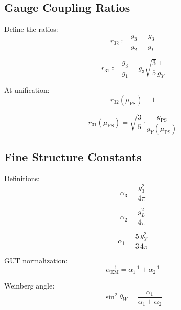 \documentclass[11pt,a4paper]{article}
\theoremstyle{definition}
\begin{document}
\subsection{Gauge Coupling Ratios}
\label{subsec:coupling-ratios}

Define the ratios:
\begin{equation}
  \label{eq:ratio-32}
  r_{32} := \frac{g_3}{g_2} = \frac{g_3}{g_L}
\end{equation}

\begin{equation}
  \label{eq:ratio-31}
  r_{31} := \frac{g_3}{g_1} = g_3 \sqrt{\frac{3}{5}} \frac{1}{g_Y}
\end{equation}

At unification:
\begin{equation}
  \label{eq:ratio-unif-32}
  r_{32}(\mu_{\text{PS}}) = 1
\end{equation}

\begin{equation}
  \label{eq:ratio-unif-31}
  r_{31}(\mu_{\text{PS}}) = \sqrt{\frac{3}{5}} \cdot \frac{g_{\text{PS}}}{g_Y(\mu_{\text{PS}})}
\end{equation}

\subsection{Fine Structure Constants}
\label{subsec:fine-structure}

Definitions:
\begin{equation}
  \label{eq:alpha-3-def}
  \alpha_3 = \frac{g_3^2}{4\pi}
\end{equation}

\begin{equation}
  \label{eq:alpha-2-def}
  \alpha_2 = \frac{g_L^2}{4\pi}
\end{equation}

\begin{equation}
  \label{eq:alpha-1-def}
  \alpha_1 = \frac{5}{3} \frac{g_Y^2}{4\pi}
\end{equation}

GUT normalization:
\begin{equation}
  \label{eq:alpha-em}
  \alpha_{\text{EM}}^{-1} = \alpha_1^{-1} + \alpha_2^{-1}
\end{equation}

Weinberg angle:
\begin{equation}
  \label{eq:sin2-from-alpha}
  \sin^2\theta_W = \frac{\alpha_1}{\alpha_1 + \alpha_2}
\end{equation}
\end{document}
